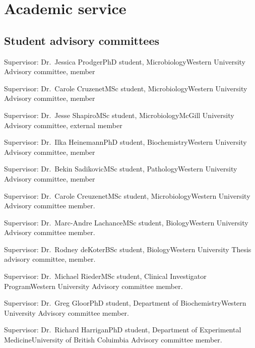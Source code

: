 \section {Academic service}

\subsection {Student advisory committees}

{Supervisor: Dr.~Jessica Prodger}{PhD student, Microbiology}{Western University}
{Advisory committee, member}

{Supervisor: Dr.~Carole Cruzenet}{MSc student, Microbiology}{Western University}
{Advisory committee, member}

{Supervisor: Dr.~Jesse Shapiro}{MSc student, Microbiology}{McGill University}
{Advisory committee, external member}


{Supervisor: Dr.~Ilka Heinemann}{PhD student, Biochemistry}{Western University}
{Advisory committee, member}

{Supervisor: Dr.~Bekin Sadikovic}{MSc student, Pathology}{Western University}
{Advisory committee, member}


{Supervisor: Dr.~Carole Creuzenet}{MSc student, Microbiology}{Western University}
{Advisory committee member.}

{Supervisor: Dr.~Marc-Andre Lachance}{MSc student, Biology}{Western University}
{Advisory committee member.}

{Supervisor: Dr.~Rodney deKoter}{BSc student, Biology}{Western University}
{Thesis advisory committee, member.}

{Supervisor: Dr.~Michael Rieder}{MSc student, Clinical Investigator Program}{Western University}
{Advisory committee member.} 

{Supervisor: Dr.~Greg Gloor}{PhD student, Department of Biochemistry}{Western University}
{Advisory committee member.}

{Supervisor: Dr.~Richard Harrigan}{PhD student, Department of Experimental Medicine}{University of British Coluimbia}
{Advisory committee member.}

